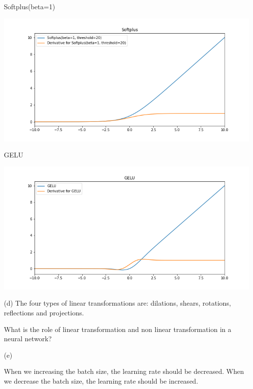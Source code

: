 Softplus(beta=1)

\includegraphics[width=\linewidth]{./imgs/softplus.png}





GELU

\includegraphics[width=\linewidth]{./imgs/GELU.png}




(d)
The four types of linear transformations are: dilations, shears, rotations, reflections and projections.

What is the role of linear transformation and non linear transformation in a neural network?

(e)

When we increasing the batch size, the learning rate should be decreased.
When we decrease the batch size, the learning rate should be increased.

